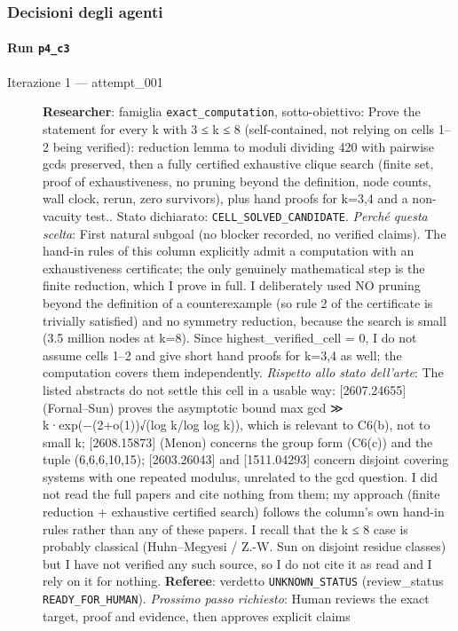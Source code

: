 \documentclass[11pt,a4paper]{article}
\begin{document}
\subsubsection{Decisioni degli agenti}
\paragraph{Run \texttt{p4\_c3}}
\begin{description}
\item[Iterazione 1 — attempt\_001]
\textbf{Researcher}: famiglia \texttt{exact\_computation}, sotto-obiettivo: Prove the statement for every k with 3 ≤ k ≤ 8 (self-contained, not relying on cells 1–2 being verified): reduction lemma to moduli dividing 420 with pairwise gcds preserved, then a fully certified exhaustive clique search (finite set, proof of exhaustiveness, no pruning beyond the definition, node counts, wall clock, rerun, zero survivors), plus hand proofs for k=3,4 and a non-vacuity test.. Stato dichiarato: \texttt{CELL\_SOLVED\_CANDIDATE}.
\emph{Perché questa scelta}: First natural subgoal (no blocker recorded, no verified claims). The hand-in rules of this column explicitly admit a computation with an exhaustiveness certificate; the only genuinely mathematical step is the finite reduction, which I prove in full. I deliberately used NO pruning beyond the definition of a counterexample (so rule 2 of the certificate is trivially satisfied) and no symmetry reduction, because the search is small (3.5 million nodes at k=8). Since highest\_verified\_cell = 0, I do not assume cells 1–2 and give short hand proofs for k=3,4 as well; the computation covers them independently.
\emph{Rispetto allo stato dell'arte}: The listed abstracts do not settle this cell in a usable way: [2607.24655] (Fornal–Sun) proves the asymptotic bound max gcd ≫ k·exp(−(2+o(1))√(log k/log log k)), which is relevant to C6(b), not to small k; [2608.15873] (Menon) concerns the group form (C6(c)) and the tuple (6,6,6,10,15); [2603.26043] and [1511.04293] concern disjoint covering systems with one repeated modulus, unrelated to the gcd question. I did not read the full papers and cite nothing from them; my approach (finite reduction + exhaustive certified search) follows the column's own hand-in rules rather than any of these papers. I recall that the k ≤ 8 case is probably classical (Huhn–Megyesi / Z.-W. Sun on disjoint residue classes) but I have not verified any such source, so I do not cite it as read and I rely on it for nothing.
\textbf{Referee}: verdetto \texttt{UNKNOWN\_STATUS} (review\_status \texttt{READY\_FOR\_HUMAN}).
\emph{Prossimo passo richiesto}: Human reviews the exact target, proof and evidence, then approves explicit claims
\end{description}
\end{document}
